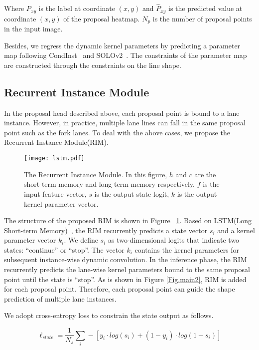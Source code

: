 \documentclass[10pt,twocolumn,letterpaper]{article}
\begin{document}
Where \(P_{xy}\) is the label at coordinate \((x,y)\) and \(\hat{P}_{xy}\) is the predicted value at coordinate \((x,y)\) of the proposal heatmap. \(N_p\) is the number of proposal points in the input image.

Besides, we regress the dynamic kernel parameters by predicting a parameter map following CondInst~\cite{tian2020conditional} and SOLOv2~\cite{wang2020solov2}. The constraints of the parameter map are constructed through the constraints on the line shape.

\subsection{Recurrent Instance Module}
In the proposal head described above, each proposal point is bound to a lane instance. However, in practice, multiple lane lines can fall in the same proposal point such as the fork lanes. To deal with the above cases, we propose the Recurrent Instance Module(RIM).

\begin{figure}[h]
\begin{center}
\texttt{[image: lstm.pdf]}
\end{center}
   \caption{The Recurrent Instance Module. In this figure, \(h\) and \(c\) are the short-term memory and long-term memory respectively, \(f\) is the input feature vector, \(s\) is the output state logit, \(k\) is the output kernel parameter vector.}
\label{Fig.lstm}
\end{figure}
The structure of the proposed RIM is shown in Figure ~\ref{Fig.lstm}. Based on LSTM(Long Short-term Memory)~\cite{hochreiter1997long}, the RIM recurrently predicts a state vector \(s_i\) and a kernel parameter vector \(k_i\). We define \(s_i\)  as two-dimensional logits that indicate two states: ``continue'' or ``stop''. The vector \(k_i\) contains the kernel parameters for subsequent instance-wise dynamic convolution. In the inference phase, the RIM recurrently predicts the lane-wise kernel parameters bound to the same proposal point until the state is ``stop''. As is shown in Figure \ref{Fig.main2}, RIM is added for each proposal point. Therefore, each proposal point can guide the shape prediction of multiple lane instances.

We adopt cross-entropy loss to constrain the state output as follows.

\begin{equation}
    \displaystyle
    \ell_{state}=\frac{1}{N_s}\sum_{i}^{}-\left [ y_i\cdot log(s_i) + (1-y_i)\cdot log(1-s_i)\right ] 
\end{equation}
\end{document}
